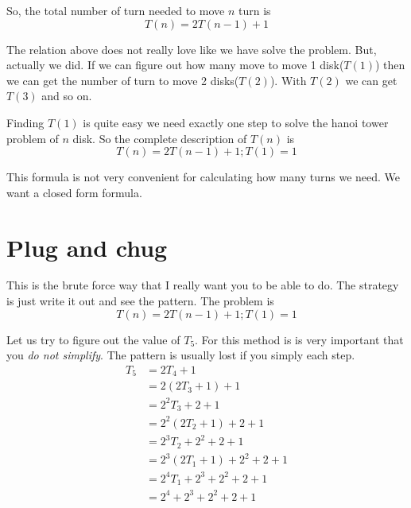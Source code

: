 \documentclass[a4paper, 12pt]{article}
\begin{document}
\begin{multicols}{2}
\begin{enumerate}[1)]
\begin{center}
	\end{center}
\end{enumerate}

So, the total number of turn needed to move $n$ turn is
\[
	T(n) = 2T(n-1) +1
\]

The relation above does not really love like we have solve the problem. But, actually we did. If we can figure out how many move to move 1 disk($T(1)$) then we can get the number of turn to move 2 disks($T(2)$). With $T(2)$ we can get $T(3)$ and so on.

Finding $T(1)$ is quite easy we need exactly one step to solve the hanoi tower problem of $n$ disk. So the complete description of $T(n)$ is
\[
T(n) = 2T(n-1) +1; T(1)=1
\]

This formula is not very convenient for calculating how many turns we need. We want a closed form formula.

\section*{Plug and chug}

This is the brute force way that I really want you to be able to do. The strategy is just write it out and see the pattern. The problem is
\[
	T(n) = 2T(n-1) + 1; T(1) = 1
\]

Let us try to figure out the value of $T_5$. For this method is is very important that you \emph{do not simplify}. The pattern is usually lost if you simply each step.
\begin{align*}
	T_5 &= 2T_{4} +1 \\
	&= 2(2T_{3} + 1) +1\\
	&= 2^2T_{3} + 2 + 1\\
	&= 2^2(2T_{2} + 1) + 2 + 1\\
	&= 2^3T_{2} + 2^2 + 2 + 1\\
	&= 2^3(2T_{1}+1) + 2^2 + 2 + 1\\
	&= 2^4T_{1} + 2^3 + 2^2 + 2 + 1\\
	&= 2^4 + 2^3 + 2^2 + 2 + 1
\end{align*}


\end{multicols}
\end{document}
